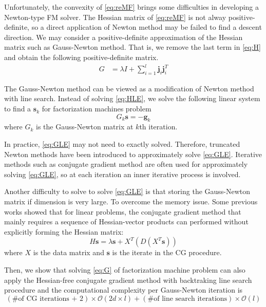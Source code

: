 \documentclass[11pt,twoside]{article}
\newcommand{\bsym}[1]{\ensuremath{\boldsymbol{#1}}}
\newcommand{\bj}{\ensuremath{\bsym{j}}}
\newcommand{\bs}{\ensuremath{\bsym{s}}}
\newcommand{\bg}{\ensuremath{\bsym{g}}}
\newcommand{\bbO}[1]{\ensuremath{\mathcal{O}\left(#1\right)}}
\begin{document}
Unfortunately, the convexity of \eqref{eq:reMF} brings some difficulties in developing a Newton-type FM solver.
The Hessian matrix of \eqref{eq:reMF}  is not alway positive-definite, so a direct application of Newton method may be failed to find a descent direction.
We may consider a positive-definite approximation of the Hessian matrix such as Gauss-Newton method. 
That is, we remove the last term in \eqref{eq:H} and obtain the following positive-definite matrix.
\begin{equation}
    \begin{aligned}
    G &= \lambda I + \sum_{i=1}^{l}\bj_i\bj_i^T
    \label{eq:G}
    \end{aligned}
\end{equation}

The Gauss-Newton method can be viewed as a modification of Newton method with line search. Instead of solving \eqref{eq:HLE}, we solve the following linear system to find a $\bs_k$ for factorization machines problem
\begin{equation}
	G_k\bs = -\bg_k
\label{eq:GLE}
\end{equation}
where $G_k$ is the Gauss-Newton matrix at $k$th iteration.


In practice, \eqref{eq:GLE} may not need to exactly solved. Therefore, truncated Newton methods have been introduced to approximately solve \eqref{eq:GLE}. Iterative methods such as conjugate gradient method are often used for approximately solving \eqref{eq:GLE}, so at each iteration an inner iterative process is involved.

Another difficulty to solve to solve \eqref{eq:GLE} is that storing the Gauss-Newton matrix if dimension is very large. To overcome the memory issue. Some previous works showed that for linear problems, the conjugate gradient method that mainly requires a sequence of Hessian-vector products can performed without explicitly forming the Hessian matrix:
\begin{equation}
    H\bs = \lambda\bs + X^T(D(X^T\bs))
\label{eq:Hv}
\end{equation}
where $X$ is the data matrix and $\bs$ is the iterate in the CG procedure.

Then, we show that solving \eqref{eq:G} of factorization machine problem can also apply the Hessian-free conjugate gradient method with backtraking line search procedure and the computational complexity per Gauss-Newton iteration is 
\begin{equation*}
(\text{\# of CG iterations + 2}) \times \bbO{2d \times l} + (\text{\# of line search iterations})\times \bbO{l}
\end{equation*}
\end{document}
